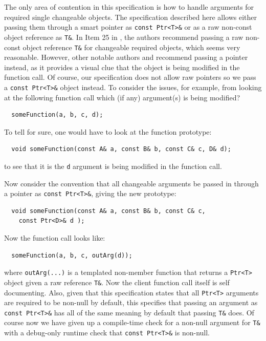 \documentclass[pdf,ps2pdf,11pt]{SANDreport}
\begin{document}
The only area of contention in this specification is how to handle
arguments for required single changeable objects.  The specification
described here allows either passing them through a smart pointer as
{}\texttt{const Ptr<T>\&} or as a raw non-const object reference as
{}\texttt{T\&}.  In Item 25 in {}\cite{C++CodingStandards05}, the
authors recommend passing a raw non-const object reference
{}\texttt{T\&} for changeable required objects, which seems very
reasonable.  However, other notable authors {}\cite[Section Section
5.5]{stroustrup97} and {}\cite[Section 13.2]{CodeComplete2nd04}
recommend passing a pointer instead, as it provides a visual clue that
the object is being modified in the function call.  Of course, our
specification does not allow raw pointers so we pass a {}\texttt{const
Ptr<T>\&} object instead.  To consider the issues, for example, from
looking at the following function call which (if any) argument(s) is
being modified?

{\small\begin{verbatim}
  someFunction(a, b, c, d);
\end{verbatim}}

To tell for sure, one would have to look at the function prototype:

{\small\begin{verbatim}
  void someFunction(const A& a, const B& b, const C& c, D& d);
\end{verbatim}}

to see that it is the {}\texttt{d} argument is being modified in the
function call.

Now consider the convention that all changeable arguments be passed in
through a pointer as {}\texttt{const Ptr<T>\&}, giving the new
prototype:

{\small\begin{verbatim}
  void someFunction(const A& a, const B& b, const C& c,
    const Ptr<D>& d );
\end{verbatim}}

Now the function call looks like:

{\small\begin{verbatim}
  someFunction(a, b, c, outArg(d));
\end{verbatim}}

where {}\texttt{outArg(...)} is a templated non-member function that
returns a {}\texttt{Ptr<T>} object given a raw reference
{}\texttt{T\&}.  Now the client function call itself is self
documenting.  Also, given that this specification states that all
{}\texttt{Ptr<T>} arguments are required to be non-null by default,
this specifies that passing an argument as {}\texttt{const Ptr<T>\&}
has all of the same meaning by default that passing {}\texttt{T\&}
does.  Of course now we have given up a compile-time check for a
non-null argument for {}\texttt{T\&} with a debug-only runtime check
that {}\texttt{const Ptr<T>\&} is non-null.
\end{document}
